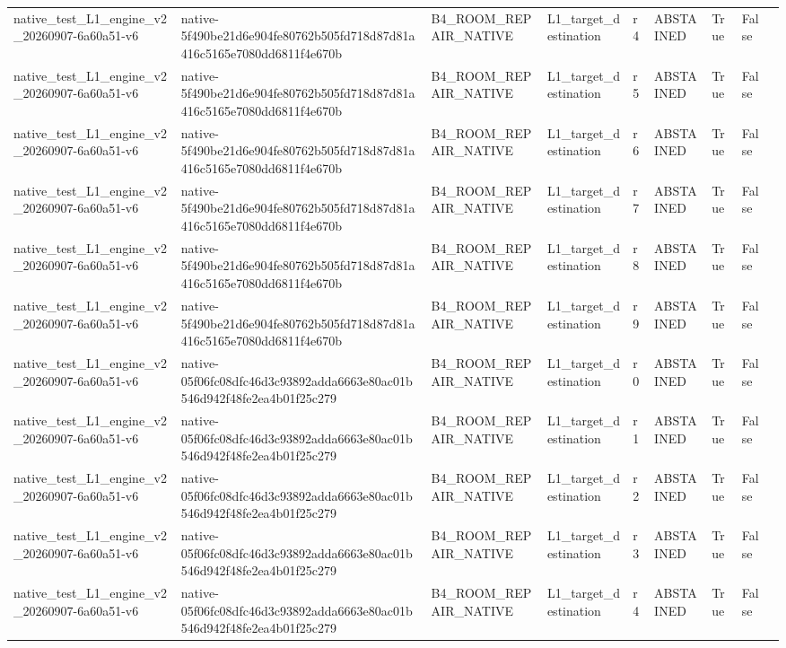 \begin{tabular}{lllllllll}
native\_test\_L1\_engine\_v2\_20260907-6a60a51-v6 & native-5f490be21d6e904fe80762b505fd718d87d81a416c5165e7080dd6811f4e670b & B4\_ROOM\_REPAIR\_NATIVE & L1\_target\_destination & r4 & ABSTAINED & True & False &  \\
native\_test\_L1\_engine\_v2\_20260907-6a60a51-v6 & native-5f490be21d6e904fe80762b505fd718d87d81a416c5165e7080dd6811f4e670b & B4\_ROOM\_REPAIR\_NATIVE & L1\_target\_destination & r5 & ABSTAINED & True & False &  \\
native\_test\_L1\_engine\_v2\_20260907-6a60a51-v6 & native-5f490be21d6e904fe80762b505fd718d87d81a416c5165e7080dd6811f4e670b & B4\_ROOM\_REPAIR\_NATIVE & L1\_target\_destination & r6 & ABSTAINED & True & False &  \\
native\_test\_L1\_engine\_v2\_20260907-6a60a51-v6 & native-5f490be21d6e904fe80762b505fd718d87d81a416c5165e7080dd6811f4e670b & B4\_ROOM\_REPAIR\_NATIVE & L1\_target\_destination & r7 & ABSTAINED & True & False &  \\
native\_test\_L1\_engine\_v2\_20260907-6a60a51-v6 & native-5f490be21d6e904fe80762b505fd718d87d81a416c5165e7080dd6811f4e670b & B4\_ROOM\_REPAIR\_NATIVE & L1\_target\_destination & r8 & ABSTAINED & True & False &  \\
native\_test\_L1\_engine\_v2\_20260907-6a60a51-v6 & native-5f490be21d6e904fe80762b505fd718d87d81a416c5165e7080dd6811f4e670b & B4\_ROOM\_REPAIR\_NATIVE & L1\_target\_destination & r9 & ABSTAINED & True & False &  \\
native\_test\_L1\_engine\_v2\_20260907-6a60a51-v6 & native-05f06fc08dfc46d3c93892adda6663e80ac01b546d942f48fe2ea4b01f25c279 & B4\_ROOM\_REPAIR\_NATIVE & L1\_target\_destination & r0 & ABSTAINED & True & False &  \\
native\_test\_L1\_engine\_v2\_20260907-6a60a51-v6 & native-05f06fc08dfc46d3c93892adda6663e80ac01b546d942f48fe2ea4b01f25c279 & B4\_ROOM\_REPAIR\_NATIVE & L1\_target\_destination & r1 & ABSTAINED & True & False &  \\
native\_test\_L1\_engine\_v2\_20260907-6a60a51-v6 & native-05f06fc08dfc46d3c93892adda6663e80ac01b546d942f48fe2ea4b01f25c279 & B4\_ROOM\_REPAIR\_NATIVE & L1\_target\_destination & r2 & ABSTAINED & True & False &  \\
native\_test\_L1\_engine\_v2\_20260907-6a60a51-v6 & native-05f06fc08dfc46d3c93892adda6663e80ac01b546d942f48fe2ea4b01f25c279 & B4\_ROOM\_REPAIR\_NATIVE & L1\_target\_destination & r3 & ABSTAINED & True & False &  \\
native\_test\_L1\_engine\_v2\_20260907-6a60a51-v6 & native-05f06fc08dfc46d3c93892adda6663e80ac01b546d942f48fe2ea4b01f25c279 & B4\_ROOM\_REPAIR\_NATIVE & L1\_target\_destination & r4 & ABSTAINED & True & False &  \\

\end{tabular}
